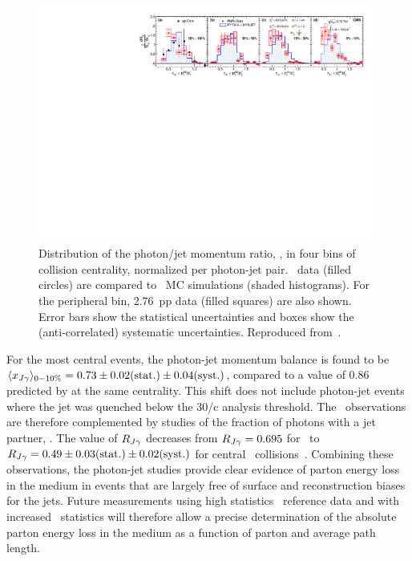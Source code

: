 \begin{figure}[!ht]
\begin{center}
\includegraphics[width=0.98\textwidth]{jetfigures/Photonv7_Paper_InclPtRatio_all_cent4_G60J30_subDPhi1SS1_Isol0_Norm1log1.pdf}
\caption[]{\label{fig:GR:InclPtRatio_qcdPhoRef_pp2760-xJ30G60} Distribution of the photon/jet 
momentum ratio, \xjg, in four bins of collision centrality, normalized per 
photon-jet pair. \PbPb\ data (filled circles) are compared to \PYTHYD\ MC simulations
(shaded histograms). For the peripheral bin,  2.76\TeV\ pp data (filled squares)
are also shown.  Error bars show the statistical uncertainties and
boxes show the (anti-correlated) systematic uncertainties. Reproduced from~\cite{Chatrchyan:2012gt}.}
\label{fig:GR:CMS_xjg}
\end{center}
\end{figure}

For the most central events, the  photon-jet momentum balance  is found to be
$\langle x_{J\gamma}\rangle_{0-10\%} = 0.73 \pm 0.02 \mbox{(stat.)} \pm 0.04 \mbox{(syst.)}$, compared
to a value of 0.86 predicted by \PYTHYD{} at the same centrality. This shift does
not include photon-jet events where the jet was quenched below the 30\GeV/c analysis threshold.
The \xjg\ observations are therefore complemented by studies of the fraction of
photons with a jet partner, \rjg.  The value of $R_{J\gamma}$ decreases
from $R_{J\gamma} = 0.695$ for \PYTHYD\
to  $R_{J\gamma} = 0.49\pm 0.03\mbox{(stat.)}\pm 0.02\mbox{(syst.)}$ for
central \PbPb\ collisions~\cite{Chatrchyan:2012gt}. Combining these observations, the photon-jet studies
provide clear evidence of parton energy loss in the medium in events that are
largely free of surface and reconstruction biases for the jets. Future measurements
using high statistics \pp\ reference data and with increased \PbPb\ statistics will
therefore allow a precise determination of the absolute parton energy loss
in the medium as a function of parton \pT and average path length.

